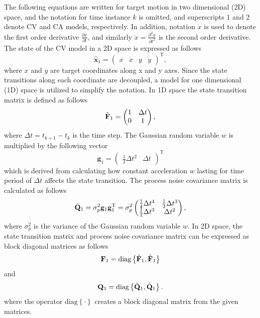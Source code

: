 \documentclass[english, 12pt, a4paper, elec, utf8, a-1b, online]{aaltothesis}
\renewcommand{\vec}[1]{\mathbf{#1}}
\newcommand{\transpose}[1]{#1^\text{T}}
\newcommand{\dt}{\Delta t}
\newcommand{\diag}[1]{\text{diag}\left\{ #1 \right\}}
\begin{document}
The following equations are written for target motion in two dimensional (2D) space, and
the notation for time instance $k$ is omitted, and superscripts $1$ and $2$ denote CV and CA models, respectively. 
In addition, notation $\dot{x}$ is used to denote the first order derivative $\frac{\partial x}{\partial t}$, and similarly $\ddot{x}=\frac{\partial^2 x}{\partial t^2}$ is the second order derivative.
The state of the CV model in a 2D space is expressed as follows
\begin{equation}\label{eq:x_mode1}
    \hat{\mathbf{x}}_1 =
        \transpose{
        \begin{pmatrix}
            x & \dot{x} & y & \dot{y}
    \end{pmatrix}},
\end{equation}
where $x$ and $y$ are target coordinates along x and y axes. 
Since the state transitions along each coordinate are decoupled, a model for one dimensional (1D) space is utilized to simplify the notation.
In 1D space the state transition matrix is defined as follows
\begin{equation}\label{eq:f_mode1}
    \Tilde{\vec{F}}_1 =
    \begin{pmatrix}
        1 & \dt \\
        0 & 1  \\
    \end{pmatrix},
\end{equation}
where $\dt=t_{k+1} - t_k$ is the time step.
The Gaussian random variable $w$ is multiplied by the following vector
\begin{equation}\label{eq:g_noise_mode1}
\vec{g}_1 =\transpose{\begin{pmatrix}
        \frac{1}{2} \dt^2 & \dt
    \end{pmatrix}}
\end{equation}
which is derived from calculating how constant acceleration $w$ lasting for time period of $\dt$ affects the state transition.
The process noise covariance matrix is calculated as follows  
\begin{equation}
    \Tilde{\vec{Q}}_1 = \sigma_p^2 \vec{g}_1 \transpose{\vec{g}_1}
    = \sigma_p^2
    \begin{pmatrix}
        \frac{1}{4} \dt^4 & \frac{1}{2} \dt^3 \\ 
        \frac{1}{2} \dt^3 & \dt^2 \\ 
    \end{pmatrix},
\end{equation}
where $\sigma_p^2$ is the variance of the Gaussian random variable $w$.
In 2D space, the state transition matrix and process noise covariance matrix can be expressed as block diagonal matrices as follows 
\begin{equation}\label{eq:F_mode1}
\vec{F}_1 = \diag{\Tilde{\vec{F}}_1, \Tilde{\vec{F}}_1}
\end{equation}
and
\begin{equation}
    \vec{Q}_1 = \diag{\Tilde{\vec{Q}}_1, \Tilde{\vec{Q}}_1}.
\end{equation}
where the operator $\diag{\cdot}$ creates a block diagonal matrix from the given matrices.
\end{document}
